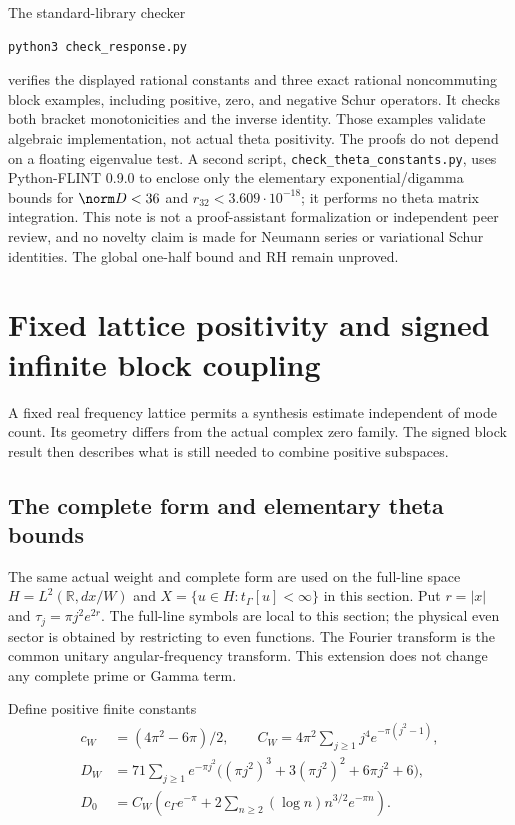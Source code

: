\documentclass[11pt,a4paper]{article}
\numberwithin{equation}{section}
\theoremstyle{definition}\newtheorem{definition}[theorem]{Definition}
\theoremstyle{remark}\newtheorem{remark}[theorem]{Remark}
\newcommand{\R}{\mathbb R}\newcommand{\C}{\mathbb C}\newcommand{\N}{\mathbb N}
\begin{document}
The standard-library checker
\begin{verbatim}
python3 check_response.py
\end{verbatim}
verifies the displayed rational constants and three exact rational
noncommuting block examples, including positive, zero, and negative
Schur operators. It checks both bracket monotonicities and the inverse
identity. Those examples validate algebraic implementation, not actual
theta positivity. The proofs do not depend on a floating eigenvalue
test. A second script, \texttt{check\_theta\_constants.py}, uses
Python-FLINT 0.9.0 to enclose only the elementary exponential/digamma
bounds for $\norm D<36$ and $r_{32}<3.609\cdot10^{-18}$; it performs no
theta matrix integration. This note is not a proof-assistant formalization or independent
peer review, and no novelty claim is made for Neumann series or
variational Schur identities. The global one-half bound and RH remain
unproved.


\section{Fixed lattice positivity and signed infinite block coupling}\label{sec:fixed-lattice}
A fixed real frequency lattice permits a synthesis estimate independent of mode count. Its geometry differs from the actual complex zero family. The signed block result then describes what is still needed to combine positive subspaces.

\subsection{The complete form and elementary theta bounds}
The same actual weight and complete form are used on the full-line space $H=L^2(\R,dx/W)$ and $X=\{u\in H:t_\Gamma[u]<\infty\}$ in this section. Put $r=|x|$ and $\tau_j=\pi j^2e^{2r}$. The full-line symbols are local to this section; the physical even sector is obtained by restricting to even functions. The Fourier transform is the common unitary angular-frequency transform. This extension does not change any complete prime or Gamma term.

Define positive finite constants
\begin{align*}
 c_W&=(4\pi^2-6\pi)/2,\qquad
 C_W=4\pi^2\sum_{j\ge1}j^4e^{-\pi(j^2-1)},\\
 D_W&=71\sum_{j\ge1}e^{-\pi j^2}
       \big((\pi j^2)^3+3(\pi j^2)^2+6\pi j^2+6\big),\\
 D_0&=C_W\left(c_\Gamma e^{-\pi}
            +2\sum_{n\ge2}(\log n)n^{3/2}e^{-\pi n}\right).
\end{align*}
\end{document}
